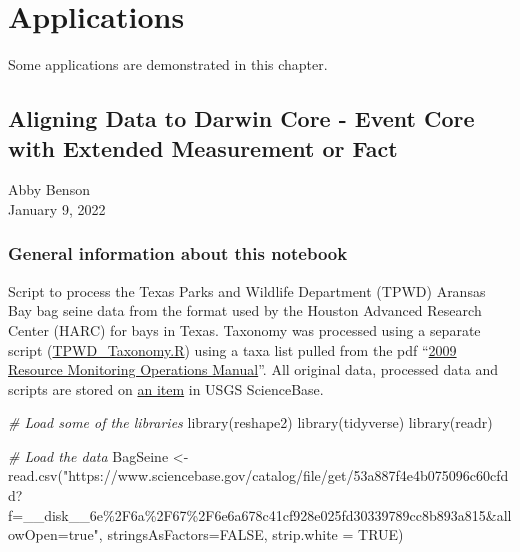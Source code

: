 \documentclass[
]{book}
\newenvironment{Shaded}{\begin{snugshade}}{\end{snugshade}}
\newcommand{\AttributeTok}[1]{\textcolor[rgb]{0.77,0.63,0.00}{#1}}
\newcommand{\CommentTok}[1]{\textcolor[rgb]{0.56,0.35,0.01}{\textit{#1}}}
\newcommand{\ConstantTok}[1]{\textcolor[rgb]{0.00,0.00,0.00}{#1}}
\newcommand{\FunctionTok}[1]{\textcolor[rgb]{0.00,0.00,0.00}{#1}}
\newcommand{\NormalTok}[1]{#1}
\newcommand{\OtherTok}[1]{\textcolor[rgb]{0.56,0.35,0.01}{#1}}
\newcommand{\StringTok}[1]{\textcolor[rgb]{0.31,0.60,0.02}{#1}}
\begin{document}
\hypertarget{applications}{%
\chapter{Applications}\label{applications}}

Some applications are demonstrated in this chapter.

\hypertarget{aligning-data-to-darwin-core---event-core-with-extended-measurement-or-fact}{%
\section{Aligning Data to Darwin Core - Event Core with Extended Measurement or Fact}\label{aligning-data-to-darwin-core---event-core-with-extended-measurement-or-fact}}

Abby Benson\\
January 9, 2022

\hypertarget{general-information-about-this-notebook}{%
\subsection{General information about this notebook}\label{general-information-about-this-notebook}}

Script to process the Texas Parks and Wildlife Department (TPWD) Aransas Bay bag seine data from
the format used by the Houston Advanced Research Center (HARC) for bays in Texas. Taxonomy was processed using a separate script (\href{https://www.sciencebase.gov/catalog/file/get/53a887f4e4b075096c60cfdd?f=__disk__ab\%2F6e\%2Ff8\%2Fab6ef8426ea328cb6c54d13ee7b6b7ce791d23f8}{TPWD\_Taxonomy.R}) using a taxa list pulled from the pdf ``\href{https://www.sciencebase.gov/catalog/file/get/53a887f4e4b075096c60cfdd?f=__disk__d9\%2Ff6\%2F46\%2Fd9f646b40cf7c6cc3fa77d1e7aebe88f46cf7145}{2009 Resource Monitoring Operations Manual}''. All original data, processed data and scripts are stored on \href{https://www.sciencebase.gov/catalog/item/53a887f4e4b075096c60cfdd}{an item} in USGS ScienceBase.

\begin{Shaded}
\begin{Highlighting}[]
\CommentTok{\# Load some of the libraries}
\FunctionTok{library}\NormalTok{(reshape2)}
\FunctionTok{library}\NormalTok{(tidyverse)}
\FunctionTok{library}\NormalTok{(readr)}
\end{Highlighting}
\end{Shaded}

\begin{Shaded}
\begin{Highlighting}[]
\CommentTok{\# Load the data}
\NormalTok{BagSeine }\OtherTok{\textless{}{-}} \FunctionTok{read.csv}\NormalTok{(}\StringTok{"https://www.sciencebase.gov/catalog/file/get/53a887f4e4b075096c60cfdd?f=\_\_disk\_\_6e\%2F6a\%2F67\%2F6e6a678c41cf928e025fd30339789cc8b893a815\&allowOpen=true"}\NormalTok{, }\AttributeTok{stringsAsFactors=}\ConstantTok{FALSE}\NormalTok{, }\AttributeTok{strip.white =} \ConstantTok{TRUE}\NormalTok{)}
\end{Highlighting}
\end{Shaded}
\end{document}
